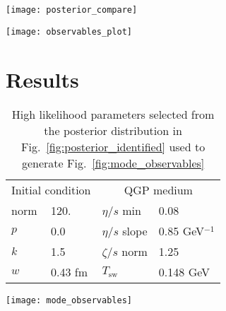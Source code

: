 \documentclass[aps,prc,reprint,amsmath]{revtex4-1}
\newcommand{\nch}{N_\text{ch}}
\begin{document}
\begin{figure*}
    \texttt{[image: posterior\_compare]}
    \caption{Comparison of the posterior distributions obtained when the model is calibrated to fit identified pion, kaon and proton yields $dN/dy$ (blue lines), and when the model is calibrated to fit integrated charged particles $d\nch/d\eta$ (orange lines). $^\dagger$The units for $\eta/s$ slope are [GeV$^{-1}$].}
\end{figure*}

\begin{figure*}
    \texttt{[image: observables\_plot]}
    \caption{Identified yields (left column), mean $p_T$ (middle column) and flow cumulants $v_n\{2\}$ (right column). The top row shows results obtained from the training data used to condition the emulator. from 100 random samples drawn from the Bayesian posterior.}
\end{figure*}

\section{Results}

\begin{table}
    \caption{High likelihood parameters selected from the posterior distribution in Fig.~\ref{fig:posterior_identified} used to generate Fig.~\ref{fig:mode_observables}}
    \begin{ruledtabular}    
        \begin{tabular}{llll}
            \multicolumn{2}{c}{Initial condition} & \multicolumn{2}{c}{QGP medium} \\
            \noalign{\smallskip}\hline\noalign{\smallskip}
            norm & 120.          &  $\eta/s$ min   & 0.08       \\
            $p$  & 0.0           &  $\eta/s$ slope & 0.85 GeV$^{-1}$   \\
            $k$  & 1.5           &  $\zeta/s$ norm & 1.25       \\
            $w$  & 0.43 fm       &  $T_\text{sw}$  & 0.148 GeV  \\
        \end{tabular}
    \end{ruledtabular}
    \label{table:likely_param}
\end{table}

\begin{figure*}
    \texttt{[image: mode\_observables]}
    \caption{Top row: model calculations of identified yields $dN/dy$, mean $p_T$ and flow cumulants $v_n\{2\}$ as a function of collision centrality using high-likelihood parameters (listed in table \ref{table:likely_param}) determined from the posterior in Fig.~\ref{fig:posterior_identified}. Symbols with error bars show data from ALICE and lines show results of the model. Bottom row: ratio of the model divided by experiment. Gray band indicates 10\% discrepancy between the model and experiment.}
    \label{fig:mode_observables}
\end{figure*}
\end{document}
